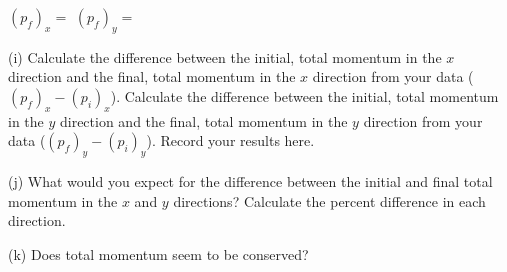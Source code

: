 \( (p_{f})_{x} =\)  \hfill{}\( (p_{f})_{y}= \) \hfill{} 
\vspace{7mm}

\newpage

(i) Calculate the difference between the initial, total momentum in the $x$ direction and the final, total momentum in the $x$ direction from your data ($(p_{f})_{x} - (p_{i})_{x}$).
Calculate the difference between the initial, total momentum in the $y$ direction and the final, total momentum in the $y$ direction from your data ($(p_{f})_{y} - (p_{i})_{y}$).
Record your results here.
\vspace{50mm}

(j) What would you expect for the difference between the initial and final total momentum in the $x$ and $y$ directions? Calculate the percent difference in each direction.
\vspace{50mm}

(k) Does total momentum seem to be conserved?
